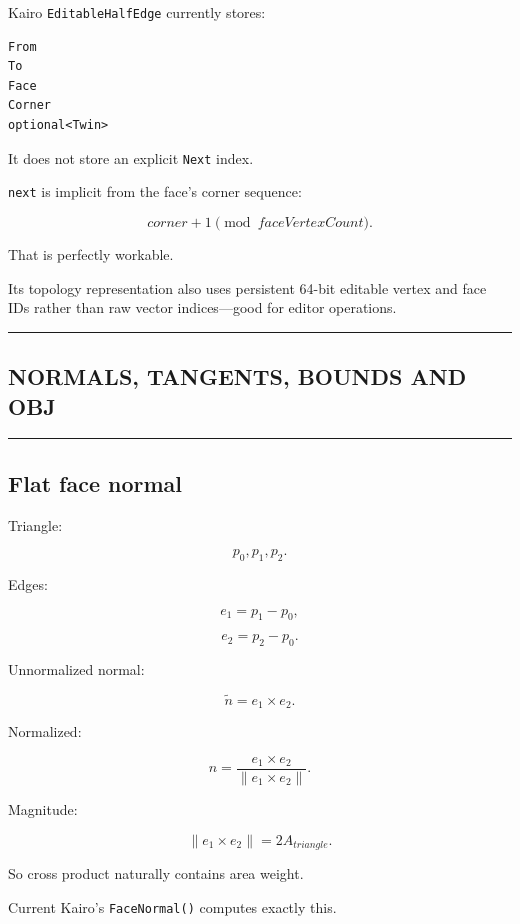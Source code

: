 Kairo \texttt{EditableHalfEdge} currently stores:

\begin{verbatim}
From
To
Face
Corner
optional<Twin>
\end{verbatim}

It does not store an explicit \texttt{Next} index.

\texttt{next} is implicit from the face's corner sequence:

\[
corner+1\pmod{faceVertexCount}.
\]

That is perfectly workable.

Its topology representation also uses persistent 64-bit editable vertex and face IDs rather than raw vector indices---good for editor operations.

\begin{center}\rule{0.5\linewidth}{0.5pt}\end{center}

\subsection{NORMALS, TANGENTS, BOUNDS AND OBJ}\label{04-visual-computing-ii-ch041-normals-tangents-bounds-and-obj}

\begin{center}\rule{0.5\linewidth}{0.5pt}\end{center}

\subsection{Flat face normal}\label{04-visual-computing-ii-ch041-flat-face-normal}

Triangle:

\[
p_0,p_1,p_2.
\]

Edges:

\[
e_1=p_1-p_0,
\]

\[
e_2=p_2-p_0.
\]

Unnormalized normal:

\[
\tilde n=
e_1\times e_2.
\]

Normalized:

\[
\boxed{
n=
\frac{
e_1\times e_2
}{
\|e_1\times e_2\|
}.
}
\]

Magnitude:

\[
\|e_1\times e_2\|
=
2A_{triangle}.
\]

So cross product naturally contains area weight.

Current Kairo's \texttt{FaceNormal()} computes exactly this.

